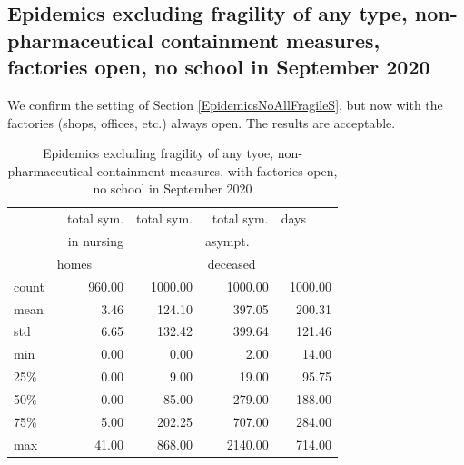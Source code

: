 \documentclass[11pt]{article}
\begin{document}
\subsection{Epidemics excluding fragility of any type, non-pharmaceutical containment measures, factories open, no school in September 2020}
\label{EpidemicsNoAllFragileFacsOnS}

We confirm the setting of Section \ref{EpidemicsNoAllFragileS}, but now with the factories (shops, offices, etc.) always open. The results are acceptable.

\begin{table}[H]
\center
\small
\begin{tabular}{lrrrr}
\toprule
{} & total sym.        &  total sym. & total sym.     & days~~~~ \\
{} & in nursing        &                  & asympt.~~~  & \\
{} & homes~~~~~  &                  & deceased~~ & \\
\midrule
count &     960.00 &             1000.00 &                 1000.00 & 1000.00 \\
mean  &       3.46 &              124.10 &                  397.05 &  200.31 \\
std   &       6.65 &              132.42 &                  399.64 &  121.46 \\
min   &       0.00 &                0.00 &                    2.00 &   14.00 \\
25\%   &       0.00 &                9.00 &                   19.00 &   95.75 \\
50\%   &       0.00 &               85.00 &                  279.00 &  188.00 \\
75\%   &       5.00 &              202.25 &                  707.00 &  284.00 \\
max   &      41.00 &              868.00 &                 2140.00 &  714.00 \\
\bottomrule
\end{tabular}

\label{EpidemicsNoAllFragileFacsOnT}
\caption{Epidemics excluding fragility of any tyoe, non-pharmaceutical containment measures, with factories open, no school in September 2020}
\end{table}
\end{document}
